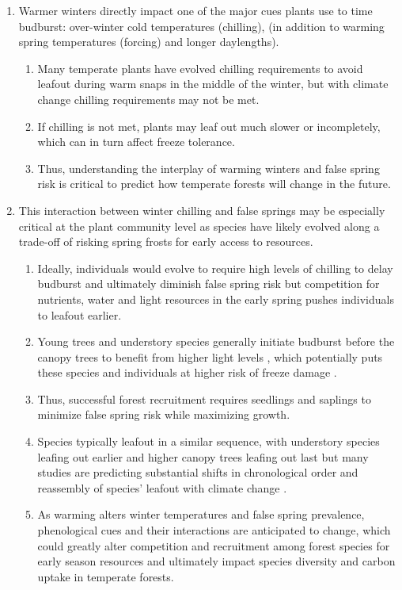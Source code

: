 \documentclass{article}\usepackage[]{graphicx}\usepackage[]{color}
\begin{document}
\begin{enumerate}
\item Warmer winters directly impact one of the  major cues plants use to time budburst: over-winter cold temperatures (chilling), (in addition to warming spring temperatures (forcing) and longer daylengths).
  \begin{enumerate}
  \item Many temperate plants have evolved chilling requirements to avoid leafout during warm snaps in the middle of the winter, but with climate change chilling requirements may not be met. 
  \item  If chilling is not met, plants may leaf out much slower or incompletely, which can in turn affect freeze tolerance. 
  \item Thus, understanding the interplay of warming winters and false spring risk is critical to predict how temperate forests will change in the future.
  \end{enumerate} 
  
\item This interaction between winter chilling and false springs may be especially critical at the plant community level as species have likely evolved along a trade-off of risking spring frosts for early access to resources.
  \begin{enumerate}
  \item Ideally, individuals would evolve to require high levels of chilling to delay budburst and ultimately diminish false spring risk but competition for nutrients, water and light resources in the early spring pushes individuals to leafout earlier. 
  \item Young trees and understory species generally initiate budburst before the canopy trees to benefit from higher light levels \citep {Augspurger2008, Vitasse2013}, which potentially puts these species and individuals at higher risk of freeze damage \citep{Vitasse2014}.
  \item Thus, successful forest recruitment requires seedlings and saplings to minimize false spring risk while maximizing growth.
  \item Species typically leafout in a similar sequence, with understory species leafing out earlier and higher canopy trees leafing out last but many studies are predicting substantial shifts in chronological order and reassembly of species' leafout with climate change \citep{Roberts2015, Laube2014}.
  \item As warming alters winter temperatures and false spring prevalence, phenological cues and their interactions are anticipated to change, which could greatly alter competition and recruitment among forest species for early season resources and ultimately impact species diversity and carbon uptake in temperate forests.
  \end{enumerate}
  

\end{enumerate}
\end{document}
